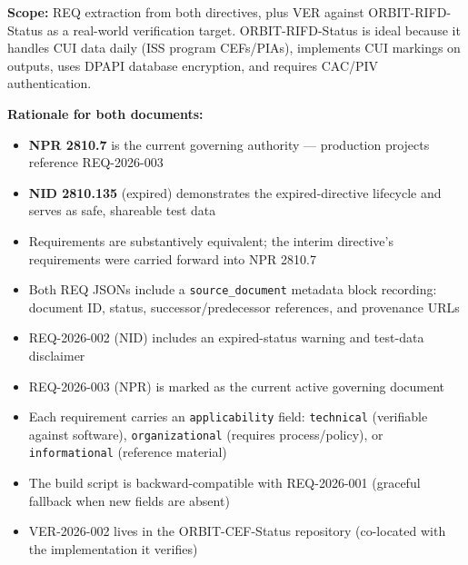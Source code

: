 {\begin{enumerate}
\textbf{Scope:} REQ extraction from both directives, plus VER against ORBIT-RIFD-Status as a real-world verification target. ORBIT-RIFD-Status is ideal because it handles CUI data daily (ISS program CEFs/PIAs), implements CUI markings on outputs, uses DPAPI database encryption, and requires CAC/PIV authentication.

\textbf{Rationale for both documents:}
\begin{itemize}
    \item \textbf{NPR 2810.7} is the current governing authority --- production projects reference REQ-2026-003
    \item \textbf{NID 2810.135} (expired) demonstrates the expired-directive lifecycle and serves as safe, shareable test data
    \item Requirements are substantively equivalent; the interim directive's requirements were carried forward into NPR 2810.7
\end{itemize}


\begin{itemize}
    \item Both REQ JSONs include a \texttt{source\_document} metadata block recording: document ID, status, successor/predecessor references, and provenance URLs
    \item REQ-2026-002 (NID) includes an expired-status warning and test-data disclaimer
    \item REQ-2026-003 (NPR) is marked as the current active governing document
    \item Each requirement carries an \texttt{applicability} field: \texttt{technical} (verifiable against software), \texttt{organizational} (requires process/policy), or \texttt{informational} (reference material)
    \item The build script is backward-compatible with REQ-2026-001 (graceful fallback when new fields are absent)
    \item VER-2026-002 lives in the ORBIT-CEF-Status repository (co-located with the implementation it verifies)
\end{itemize}



\end{enumerate}}
